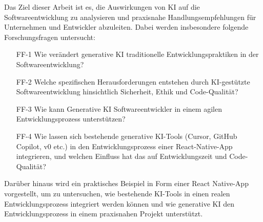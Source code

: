 Das Ziel dieser Arbeit ist es, die Auswirkungen von KI auf die Softwareentwicklung zu analysieren und praxisnahe Handlungsempfehlungen für Unternehmen und Entwickler abzuleiten. Dabei werden insbesondere folgende Forschungsfragen untersucht:

\begin{itemize}
    \item[FF-1] Wie verändert generative KI traditionelle Entwicklungspraktiken in der Softwareentwicklung?
    \item[FF-2] Welche spezifischen Herausforderungen entstehen durch KI-gestützte Softwareentwicklung hinsichtlich Sicherheit, Ethik und Code-Qualität?
    \item[FF-3] Wie kann Generative KI Softwareentwickler in einem agilen Entwicklungsprozess unterstützen? 
    \item[FF-4] Wie lassen sich bestehende generative KI-Tools (Cursor, GitHub Copilot, v0 etc.) in den Entwicklungsprozess einer React-Native-App integrieren, und welchen Einfluss hat das auf Entwicklungszeit und Code-Qualität?
\end{itemize}

Darüber hinaus wird ein praktisches Beispiel in Form einer React Native-App vorgestellt, um zu untersuchen, wie bestehende  KI-Tools in einen realen Entwicklungsprozess integriert werden können und wie generative KI den Entwicklungsprozess in einem praxisnahen Projekt unterstützt.